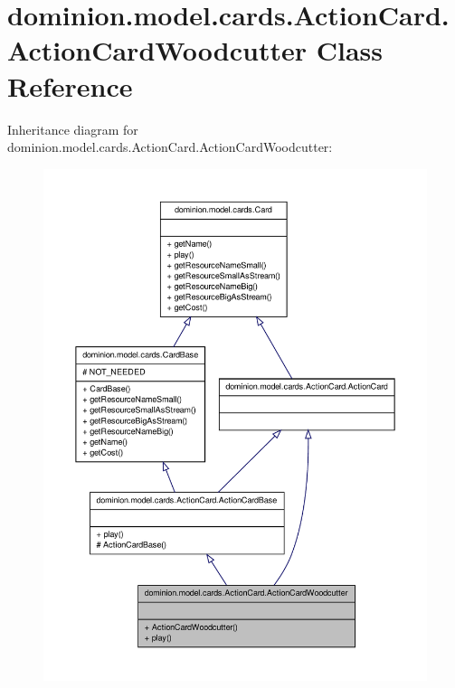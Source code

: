 \hypertarget{classdominion_1_1model_1_1cards_1_1ActionCard_1_1ActionCardWoodcutter}{\section{dominion.\-model.\-cards.\-Action\-Card.\-Action\-Card\-Woodcutter \-Class \-Reference}
\label{classdominion_1_1model_1_1cards_1_1ActionCard_1_1ActionCardWoodcutter}
}


\-Inheritance diagram for dominion.\-model.\-cards.\-Action\-Card.\-Action\-Card\-Woodcutter\-:
\nopagebreak
\begin{figure}[H]
\begin{center}
\leavevmode
\includegraphics[width=350pt]{classdominion_1_1model_1_1cards_1_1ActionCard_1_1ActionCardWoodcutter__inherit__graph}
\end{center}
\end{figure}


